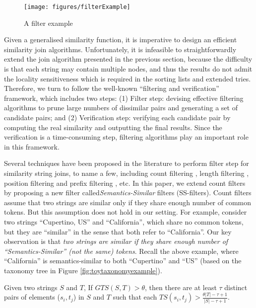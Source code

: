 \begin{figure}[t]
\centering
\texttt{[image: figures/filterExample]}
 \caption{A filter example}
\label{fig:filterexample}
\end{figure}

Given a generalised similarity function, it is imperative to design an efficient similarity join algorithms. Unfortunately, it is infeasible to straightforwardly extend the join algorithm presented in the previous section, because  the difficulty is that each string may contain multiple nodes, and thus the results  do not admit the locality sensitiveness which is required in the sorting lists and extended tries.  Therefore, we turn to follow the well-known ``filtering and verification'' framework, which includes two steps: (1) Filter step: devising effective filtering algorithms to prune large numbers of dissimilar pairs and generating a set of candidate pairs; and (2) Verification step: verifying each candidate pair by computing
the real similarity and outputting the final results. Since the verification is a time-consuming step,  filtering algorithms play an important role in this framework.

Several techniques have been proposed in the literature to perform
filter step for similarity string joins, to name a few, including  count filtering \cite{conf/vldb/GravanoIJKMS01}, length filtering \cite{conf/vldb/ArasuGK06}, position filtering \cite{conf/esa/SutinenT95} and prefix filtering \cite{conf/sigmod/WangLF12}, etc. In this paper, we extend count filters by proposing a new filter called\textit{Semantics-Similar} filters (SS-filters). Count filters assume that two strings are similar only if they share enough number of common tokens. But this assumption does not hold in our setting. For example, consider two strings ``\textsf{Cupertino, US}'' and ``\textsf{California}'', which share no common tokens, but  they are ``similar'' in the sense that both refer to ``\textsf{California}''.   Our key observation is that \textit{two strings are similar if they share enough number of ``Semantics-Similar'' (not the same) tokens}. Recall the above example, where ``\textsf{California}'' is semantics-similar to both ``\textsf{Cupertino}'' and ``\textsf{US}'' (based on the taxonomy tree in Figure \ref{fig:toytaxonomyexample}).


\smallskip

\begin{lem}  Given two strings $S$ and $T$,  If $GTS(S,T) > \theta$,  then there are at least $\tau$ distinct pairs of elements ($s_i, t_j$) in  $S$ and $T$ such that each $TS(s_i, t_j) > \frac{\theta |T| - \tau +1}{|S|- \tau +1} $. \label{lem:psimilarity}
\end{lem}

